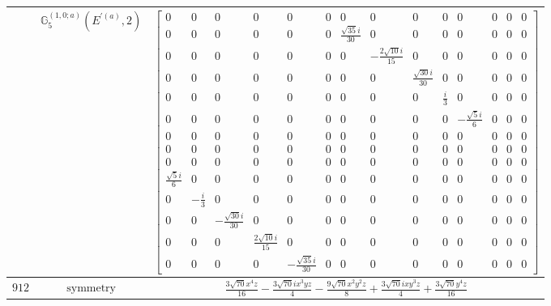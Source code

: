 \documentclass[fleqn,8pt,landscape]{jsarticle}
\begin{document}
\begin{longtable}{ccc}
$  $ & $ \mathbb{G}_{5}^{(1,0;a)}(E^{\prime(a)},2) $ & $ \begin{bmatrix} 0 & 0 & 0 & 0 & 0 & 0 & 0 & 0 & 0 & 0 & 0 & 0 & 0 & 0 \\ 0 & 0 & 0 & 0 & 0 & 0 & \frac{\sqrt{35} i}{30} & 0 & 0 & 0 & 0 & 0 & 0 & 0 \\ 0 & 0 & 0 & 0 & 0 & 0 & 0 & - \frac{2 \sqrt{10} i}{15} & 0 & 0 & 0 & 0 & 0 & 0 \\ 0 & 0 & 0 & 0 & 0 & 0 & 0 & 0 & \frac{\sqrt{30} i}{30} & 0 & 0 & 0 & 0 & 0 \\ 0 & 0 & 0 & 0 & 0 & 0 & 0 & 0 & 0 & \frac{i}{3} & 0 & 0 & 0 & 0 \\ 0 & 0 & 0 & 0 & 0 & 0 & 0 & 0 & 0 & 0 & - \frac{\sqrt{5} i}{6} & 0 & 0 & 0 \\ 0 & 0 & 0 & 0 & 0 & 0 & 0 & 0 & 0 & 0 & 0 & 0 & 0 & 0 \\ 0 & 0 & 0 & 0 & 0 & 0 & 0 & 0 & 0 & 0 & 0 & 0 & 0 & 0 \\ 0 & 0 & 0 & 0 & 0 & 0 & 0 & 0 & 0 & 0 & 0 & 0 & 0 & 0 \\ \frac{\sqrt{5} i}{6} & 0 & 0 & 0 & 0 & 0 & 0 & 0 & 0 & 0 & 0 & 0 & 0 & 0 \\ 0 & - \frac{i}{3} & 0 & 0 & 0 & 0 & 0 & 0 & 0 & 0 & 0 & 0 & 0 & 0 \\ 0 & 0 & - \frac{\sqrt{30} i}{30} & 0 & 0 & 0 & 0 & 0 & 0 & 0 & 0 & 0 & 0 & 0 \\ 0 & 0 & 0 & \frac{2 \sqrt{10} i}{15} & 0 & 0 & 0 & 0 & 0 & 0 & 0 & 0 & 0 & 0 \\ 0 & 0 & 0 & 0 & - \frac{\sqrt{35} i}{30} & 0 & 0 & 0 & 0 & 0 & 0 & 0 & 0 & 0 \end{bmatrix} $ \\ \hline
$ 912 $ & $ \text{symmetry} $ & $ \frac{3 \sqrt{70} x^{4} z}{16} - \frac{3 \sqrt{70} i x^{3} y z}{4} - \frac{9 \sqrt{70} x^{2} y^{2} z}{8} + \frac{3 \sqrt{70} i x y^{3} z}{4} + \frac{3 \sqrt{70} y^{4} z}{16} $ \\

\end{longtable}
\end{document}
